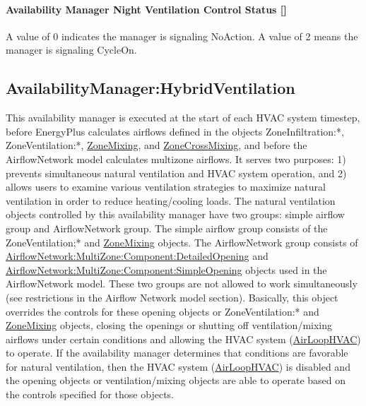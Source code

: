\paragraph{Availability Manager Night Ventilation Control Status {[]}}\label{availability-manager-night-ventilation-control-status}

A value of 0 indicates the manager is signaling NoAction. A value of 2 means the manager is signaling CycleOn.

\subsection{AvailabilityManager:HybridVentilation}\label{availabilitymanagerhybridventilation}

This availability manager is executed at the start of each HVAC system timestep, before EnergyPlus calculates airflows defined in the objects ZoneInfiltration:*, ZoneVentilation:*, \hyperref[zonemixing]{ZoneMixing}, and \hyperref[zonecrossmixing]{ZoneCrossMixing}, and before the AirflowNetwork model calculates multizone airflows. It serves two purposes: 1) prevents simultaneous natural ventilation and HVAC system operation, and 2) allows users to examine various ventilation strategies to maximize natural ventilation in order to reduce heating/cooling loads. The natural ventilation objects controlled by this availability manager have two groups: simple airflow group and AirflowNetwork group. The simple airflow group consists of the ZoneVentilation;* and \hyperref[zonemixing]{ZoneMixing} objects. The AirflowNetwork group consists of \hyperref[airflownetworkmultizonecomponentdetailedopening]{AirflowNetwork:MultiZone:Component:DetailedOpening} and \hyperref[airflownetworkmultizonecomponentsimpleopening]{AirflowNetwork:MultiZone:Component:SimpleOpening} objects used in the AirflowNetwork model. These two groups are not allowed to work simultaneously (see restrictions in the Airflow Network model section). Basically, this object overrides the controls for these opening objects or ZoneVentilation:* and \hyperref[zonemixing]{ZoneMixing} objects, closing the openings or shutting off ventilation/mixing airflows under certain conditions and allowing the HVAC system (\hyperref[airloophvac]{AirLoopHVAC}) to operate. If the availability manager determines that conditions are favorable for natural ventilation, then the HVAC system (\hyperref[airloophvac]{AirLoopHVAC}) is disabled and the opening objects or ventilation/mixing objects are able to operate based on the controls specified for those objects.

